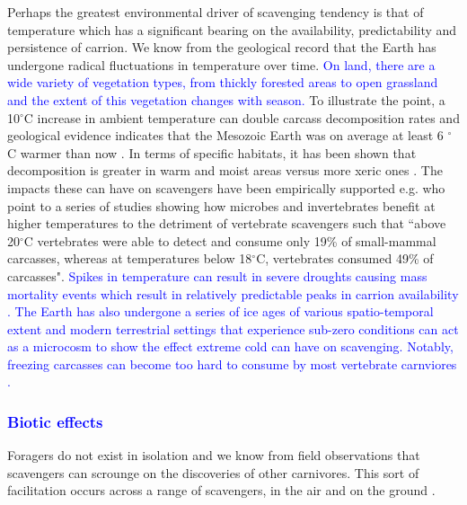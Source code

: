 \documentclass[a4paper,12pt]{article}
\begin{document}
Perhaps the greatest environmental driver of scavenging tendency is that of temperature which has a significant bearing on the availability, predictability and persistence of carrion.
We know from the geological record that the Earth has undergone radical fluctuations in temperature over time.
\textcolor{blue}{On land, there are a wide variety of vegetation types, from thickly forested areas to open grassland and the extent of this vegetation changes with season.}
To illustrate the point, a 10$^{\circ}$C increase in ambient temperature can double carcass decomposition rates \citep{parmenter2009carrion} and geological evidence indicates that the Mesozoic Earth was on average at least 6 $^{\circ}$C warmer than now \citep{sellwood2006mesozoic}.
In terms of specific habitats, it has been shown that decomposition is greater in warm and moist areas versus more xeric ones \citep{beasley2015vertebrates}.
The impacts these can have on scavengers have been empirically supported e.g. \cite{beasley2015vertebrates} who point to a series of studies showing how microbes and invertebrates benefit at higher temperatures to the detriment of vertebrate scavengers such that ``above 20$^{\circ}$C vertebrates were able to detect and consume only 19\% of small-mammal carcasses, whereas at temperatures below 18$^{\circ}$C, vertebrates consumed 49\% of carcasses".
\textcolor{blue}{
Spikes in temperature can result in severe droughts causing mass mortality events which result in relatively predictable peaks in carrion availability \citep{kendall2014african}.%
The Earth has also undergone a series of ice ages of various spatio-temporal extent \citep{diedrich2012cave} and modern terrestrial settings that experience sub-zero conditions can act as a microcosm to show the effect extreme cold can have on scavenging.
Notably, freezing carcasses can become too hard to consume by most vertebrate carnviores \citep{selva2003scavenging}.}

\subsubsection{\textcolor{blue}{Biotic effects}}
Foragers do not exist in isolation and we know from field observations that scavengers can scrounge on the discoveries of other carnivores. 
This sort of facilitation occurs across a range of scavengers, in the air and on the ground \citep{KaneVul,jones2015african}. 
\end{document}
